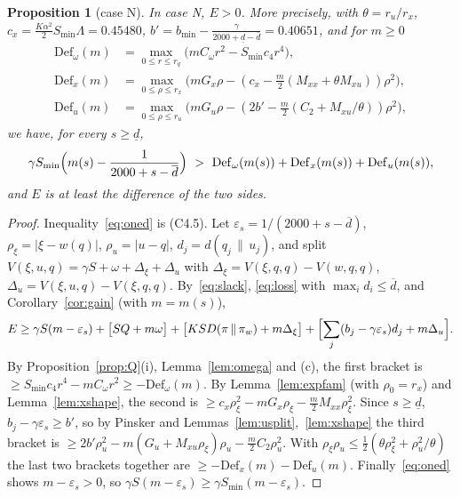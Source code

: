 \documentclass[11pt]{article}
\newtheorem{proposition}[lemma]{Proposition}
\theoremstyle{definition}
\numberwithin{equation}{section}
\newcommand{\KLb}[2]{d(#1\,\|\,#2)}
\newcommand{\KL}[2]{D(#1\,\|\,#2)}
\newcommand{\Azero}{2000}
\newcommand{\dlo}{\underline d}
\newcommand{\dhi}{\overline d}
\newcommand{\Smin}{S_{\min}}
\newcommand{\bmin}{b_{\min}}
\begin{document}
\begin{proposition}[case N]\label{prop:near}
In case N, $E>0$. More precisely, with $\theta=r_u/r_x$, $c_x=\frac{K\alpha^2}2\Smin\Lambda=0.45480$, $b'=\bmin-\frac\gamma{\Azero+\dlo-\dhi}=0.40651$,
and for $m\ge0$
\begin{align*}
\mathrm{Def}_\omega(m)&=\max_{0\le r\le r_q}\bigl(mC_\omega r^2-\Smin c_4r^4\bigr),\\
\mathrm{Def}_x(m)&=\max_{0\le\rho\le r_x}\bigl(mG_x\rho-(c_x-\tfrac m2(M_{xx}+\theta M_{xu}))\rho^2\bigr),\\
\mathrm{Def}_u(m)&=\max_{0\le\rho\le r_u}\bigl(mG_u\rho-(2b'-\tfrac m2(C_2+M_{xu}/\theta))\rho^2\bigr),
\end{align*}
we have, for every $s\ge\dlo$,
\begin{equation}\label{eq:oned}
\gamma\Smin\Bigl(m(s)-\frac1{\Azero+s-\dhi}\Bigr)\ >\ \mathrm{Def}_\omega(m(s))+\mathrm{Def}_x(m(s))+\mathrm{Def}_u(m(s)),
\end{equation}
and $E$ is at least the difference of the two sides.
\end{proposition}
\begin{proof}
Inequality~\eqref{eq:oned} is (C4.5). Let $\varepsilon_s=1/(\Azero+s-\dhi)$, $\rho_\xi=|\xi-w(q)|$, $\rho_u=|u-q|$, $d_j=\KLb{q_j}{u_j}$, and
split $V(\xi,u,q)=\gamma S+\omega+\Delta_\xi+\Delta_u$ with $\Delta_\xi=V(\xi,q,q)-V(w,q,q)$, $\Delta_u=V(\xi,u,q)-V(\xi,q,q)$. By~\eqref{eq:slack},
\eqref{eq:loss} with $\max_id_i\le\dhi$, and Corollary~\ref{cor:gain} (with $m=m(s)$),
\[
E\ge\gamma S(m-\varepsilon_s)+\bigl[SQ+m\omega\bigr]+\bigl[KS\KL\pi{\pi_w}+m\Delta_\xi\bigr]+\Bigl[\sum_j(b_j-\gamma\varepsilon_s)d_j+m\Delta_u\Bigr].
\]
By Proposition~\ref{prop:Q}(i), Lemma~\ref{lem:omega} and (c), the first bracket is $\ge\Smin c_4r^4-mC_\omega r^2\ge-\mathrm{Def}_\omega(m)$.
By Lemma~\ref{lem:expfam} (with $\rho_0=r_x$) and Lemma~\ref{lem:xshape}, the second is $\ge c_x\rho_\xi^2-mG_x\rho_\xi-\frac m2M_{xx}\rho_\xi^2$. Since
$s\ge\dlo$, $b_j-\gamma\varepsilon_s\ge b'$, so by Pinsker and Lemmas~\ref{lem:usplit},~\ref{lem:xshape} the third bracket is
$\ge2b'\rho_u^2-m(G_u+M_{xu}\rho_\xi)\rho_u-\frac m2C_2\rho_u^2$. With $\rho_\xi\rho_u\le\frac12(\theta\rho_\xi^2+\rho_u^2/\theta)$ the last two
brackets together are $\ge-\mathrm{Def}_x(m)-\mathrm{Def}_u(m)$. Finally~\eqref{eq:oned} shows $m-\varepsilon_s>0$, so $\gamma S(m-\varepsilon_s)\ge
\gamma\Smin(m-\varepsilon_s)$.
\end{proof}
\end{document}

